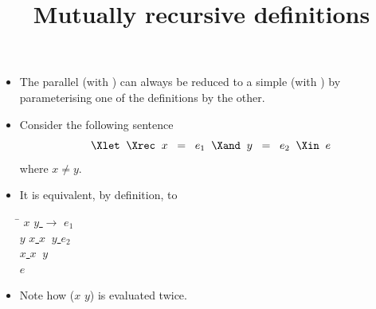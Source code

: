 \documentclass[wide]{slides}
\begin{document}
\begin{slide}
  \title{Mutually recursive definitions}

  \begin{itemize}

    \item The parallel \Xlet{} \Xrec{} (with \Xand) can always be
      reduced to a simple \Xlet{} \Xrec{} (with \Xin) by
      parameterising one of the definitions by the other.

    \item Consider the following sentence
      \begin{equation*}
        \Xlet \;\; \Xrec \;\; x \;\; = \;\; e_1 \;\; \Xand \;\; y \;\;
        = \;\; e_2 \;\; \Xin \;\; e
      \end{equation*}
      where $x \neq y$.

    \item It is equivalent, by definition, to
      \begin{center}
        \begin{minipage}{0.3\linewidth}
          \begin{tabbing}
            \Xlet{} \= \Xrec{} $x$ \equal{} \underline{\Xfun{} $y$
              $\rightarrow$} $e_1$ \Xin\\
            \> \Xlet{} \Xrec{} $y$ \equal{} \underline{\Xlet{} $x$
              \equal{} $x \;\; y$ \Xin} $e_2$ \Xin\\
            \> \underline{\Xlet{} $x$ \equal{} $x \;\; y$}\\
            \underline{\Xin} $e$
          \end{tabbing}
        \end{minipage}
      \end{center}

    \item Note how ($x$ $y$) is evaluated twice.

  \end{itemize}

\end{slide}
\end{document}
